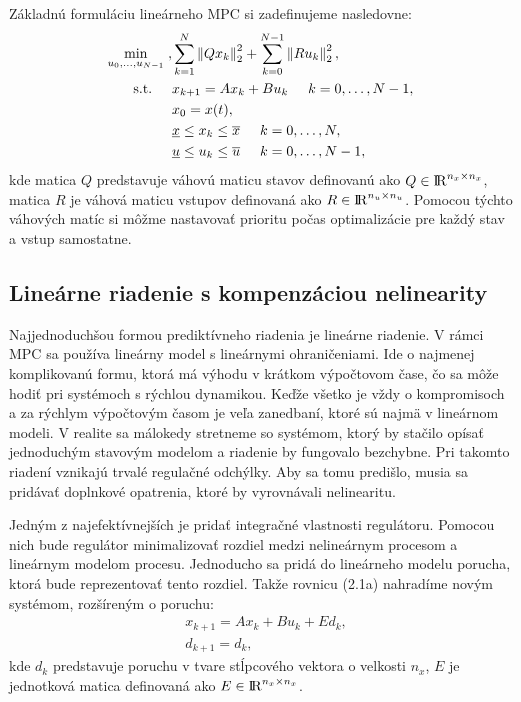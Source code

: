 Základnú formuláciu lineárneho MPC si zadefinujeme nasledovne:
\label{math:LinearneMPC}
\begin{subequations}
	\begin{align}
		\displaystyle \min_{u_0,...,u_{N-1}} \hspace{0.1cm}, & 
		\sum_{k=1}^{N}\left\lVert Qx_k\right\rVert^{2}_{2}+\sum_{k=0}^{N-1}\left\lVert Ru_k\right\rVert^{2}_{2},\\
		\textrm{s.t.} \hspace{0.5cm} & x_{k+1} = Ax_{k}+Bu_{k}\hspace{0.5cm} k=0,\dots,N-1,\\
		& x_{0} = x(t),\\
		& \underline{x} \leq x_{k} \leq \overline{x}\hspace{0.5cm} k=0,\dots,N,\\
		& \underline{u} \leq u_{k} \leq \overline{u}\hspace{0.5cm} k=0,\dots,N-1,
	\end{align}
\end{subequations}
kde matica $Q$ predstavuje váhovú maticu stavov definovanú ako $Q \in {\rm I\!R}^{n_{x}\times n_{x}}$, matica $R$ je váhová maticu vstupov definovaná ako $R \in {\rm I\!R}^{n_{u}\times n_{u}}$. Pomocou týchto váhových matíc si môžme nastavovať prioritu počas optimalizácie pre každý stav a vstup samostatne. 

\subsection{Lineárne riadenie s kompenzáciou nelinearity}
\label{subse:LinearneMPCKomp}
Najjednoduchšou formou prediktívneho riadenia je lineárne riadenie. V rámci MPC sa používa lineárny model s lineárnymi ohraničeniami. Ide o najmenej komplikovanú formu, ktorá má výhodu v krátkom výpočtovom čase, čo sa môže hodiť pri systémoch s rýchlou dynamikou. Keďže všetko je vždy o kompromisoch a za rýchlym výpočtovým časom je veľa zanedbaní, ktoré sú najmä v lineárnom modeli. V realite sa málokedy stretneme so systémom, ktorý by stačilo opísať jednoduchým stavovým modelom a riadenie by fungovalo bezchybne. Pri takomto riadení vznikajú trvalé regulačné odchýlky. Aby sa tomu predišlo, musia sa pridávať doplnkové opatrenia, ktoré by vyrovnávali nelinearitu. 

Jedným z najefektívnejších je pridať integračné vlastnosti regulátoru. Pomocou nich bude regulátor minimalizovať rozdiel medzi nelineárnym procesom a lineárnym modelom procesu. Jednoducho sa pridá do lineárneho modelu porucha, ktorá bude reprezentovať tento rozdiel. Takže rovnicu (2.1a) nahradíme novým systémom, rozšíreným o poruchu:
\begin{subequations}
	\begin{align}
		&x_{k+1} = Ax_{k} + Bu_{k} + Ed_{k},\\
		&d_{k+1} = d_{k},
	\end{align}
\end{subequations}
kde $d_{k}$ predstavuje poruchu v tvare stĺpcového vektora o velkosti $n_{x}$, $E$ je jednotková matica definovaná ako $E \in {\rm I\!R}^{n_{x}\times n_{x}}$.

